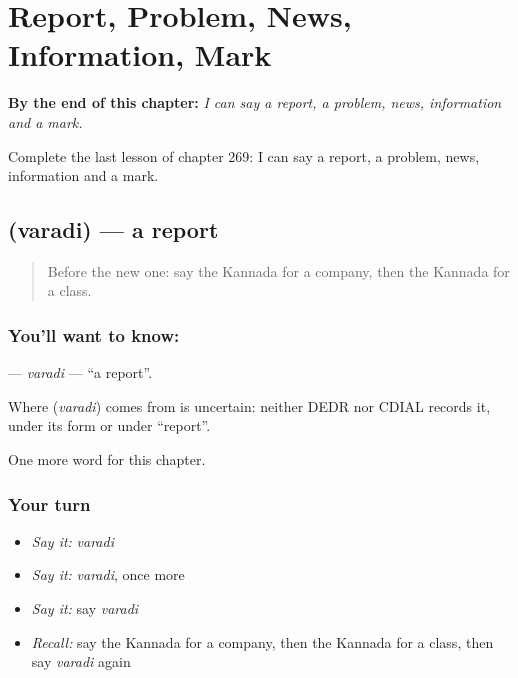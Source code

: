 
\chapter{Report, Problem, News, Information, Mark}
\label{ch:ka-report-problem-news-information-mark}

\begin{chapteropening}
\textbf{By the end of this chapter:} \emph{I can say a report, a problem, news, information and a mark.}

Complete the last lesson of chapter 269: I can say a report, a problem, news, information and a mark.
\end{chapteropening}

\section[\texorpdfstring{\kn{ವರದಿ} (varadi)}{ವರದಿ (varadi)}]{ (varadi) — a report}

\label{lesson:KA-C269-varadi}



\begin{quote}
Before the new one: say the Kannada for a company, then the Kannada for a class.
\end{quote}

\subsection*{You'll want to know: }
\textbf{} — \emph{varadi} — \textquotedblleft{}a report\textquotedblright{}.

\begin{cousinweb}
Where \textbf{} (\emph{varadi}) comes from is uncertain: neither DEDR nor CDIAL records it, under its form or under \textquotedblleft{}report\textquotedblright{}.
\end{cousinweb}

\begin{grammarlens}[title={What you've built}]
One more word for this chapter.
\end{grammarlens}

\subsection*{Your turn}
\begin{itemize}
\raggedright
  \item \emph{Say it:} \emph{varadi}
  \item \emph{Say it:} \emph{varadi}, once more
  \item \emph{Say it:} say \emph{varadi}
  \item \emph{Recall:} say the Kannada for a company, then the Kannada for a class, then say \emph{varadi} again
\end{itemize}

